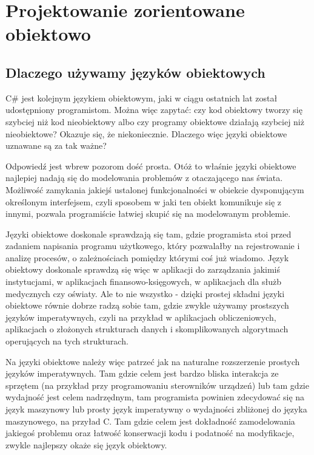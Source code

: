 ﻿\section{Projektowanie zorientowane obiektowo}

\subsection{Dlaczego używamy języków obiektowych}

C\# jest kolejnym językiem obiektowym, jaki w ciągu ostatnich lat został udostępniony programistom.
Można więc zapytać: czy kod obiektowy tworzy się szybciej niż kod nieobiektowy albo czy 
programy obiektowe działają szybciej niż nieobiektowe? Okazuje się, że niekoniecznie. Dlaczego więc
języki obiektowe uznawane są za tak ważne? 

Odpowiedź jest wbrew pozorom dość prosta. Otóż to właśnie języki obiektowe najlepiej nadają się
do modelowania problemów z otaczającego nas świata. Możliwość zamykania jakiejś ustalonej funkcjonalności
w obiekcie dysponującym określonym interfejsem, czyli sposobem w jaki ten obiekt komunikuje się z innymi,
pozwala programiście łatwiej skupić się na modelowanym problemie.

Języki obiektowe doskonale sprawdzają się tam, gdzie programista stoi przed zadaniem napisania programu
użytkowego, który pozwalałby na rejestrowanie i analizę procesów, o zależnościach pomiędzy którymi 
coś już wiadomo. Język obiektowy doskonale sprawdzą się więc w aplikacji do zarządzania jakimiś
instytucjami, w aplikacjach finansowo-księgowych, w aplikacjach dla służb medycznych czy oświaty. 
Ale to nie wszystko - dzięki prostej składni języki obiektowe równie dobrze radzą sobie tam, gdzie 
zwykle używamy prostszych języków imperatywnych, czyli na przykład w aplikacjach obliczeniowych,
aplikacjach o złożonych strukturach danych i skomplikowanych algorytmach operujących na tych strukturach.

Na języki obiektowe należy więc patrzeć jak na naturalne rozszerzenie prostych języków
imperatywnych. Tam gdzie celem jest bardzo bliska interakcja ze sprzętem (na przykład przy programowaniu
sterowników urządzeń) lub tam gdzie wydajność jest celem nadrzędnym, tam programista powinien zdecydować się
na język maszynowy lub prosty język imperatywny o wydajności zbliżonej do języka maszynowego, na przyład C.
Tam gdzie celem jest dokładność zamodelowania jakiegoś problemu oraz łatwość konserwacji kodu i podatność
na modyfikacje, zwykle najlepszy okaże się język obiektowy. 

